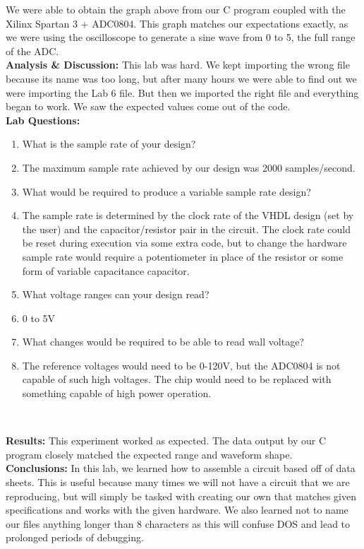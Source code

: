 \documentclass{article}
\newcommand{\Q}{\textbf{Q:}}
\newcommand{\A}{\textbf{A:}}
\newcommand{\sect}[1]{\noindent\textbf{#1}}
\begin{document}
We were able to obtain the graph above from our C program coupled with the Xilinx Spartan 3 + ADC0804. This graph matches our expectations exactly, as we were using the oscilloscope to generate a sine wave from 0 to 5, the full range of the ADC. \\

\sect{Analysis \& Discussion:} This lab was hard. We kept importing the wrong file because its name was too long, but after many hours we were able to find out we were importing the Lab 6 file. But then we imported the right file and everything began to work. We saw the expected values come out of the code.\\

\sect{Lab Questions:}

\begin{enumerate}
	\item[\Q] What is the sample rate of your design?
	\item[\A] The maximum sample rate achieved by our design was 2000 samples/second.
	\item[\Q] What would be required to produce a variable sample rate design?
	\item[\A] The sample rate is determined by the clock rate of the VHDL design (set by the user) and the capacitor/resistor pair in the circuit. The clock rate could be reset during execution via some extra code, but to change the hardware sample rate would require a potentiometer in place of the resistor or some form of variable capacitance capacitor.
	\item[\Q] What voltage ranges can your design read?
	\item[\A] 0 to 5V
	\item[\Q] What changes would be required to be able to read wall voltage?
	\item[\A] The reference voltages would need to be 0-120V, but the ADC0804 is not capable of such high voltages. The chip would need to be replaced with something capable of high power operation.
\end{enumerate}~

\sect{Results:} This experiment worked as expected. The data output by our C program closely matched the expected range and waveform shape. \\

\sect{Conclusions:} In this lab, we learned how to assemble a circuit based off of data sheets. This is useful because many times we will not have a circuit that we are reproducing, but will simply be tasked with creating our own that matches given specifications and works with the given hardware. We also learned not to name our files anything longer than 8 characters as this will confuse DOS and lead to prolonged periods of debugging.
\end{document}
